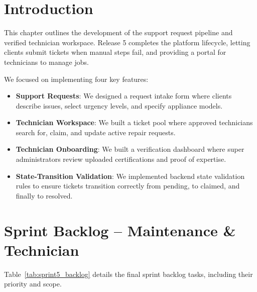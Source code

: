 \documentclass[12pt,a4paper]{report}
\begin{document}
\section{Introduction}

This chapter outlines the development of the support request pipeline and verified technician workspace. Release 5 completes the platform lifecycle, letting clients submit tickets when manual steps fail, and providing a portal for technicians to manage jobs.

We focused on implementing four key features:
\begin{itemize}
    \item \textbf{Support Requests}: We designed a request intake form where clients describe issues, select urgency levels, and specify appliance models.
    \item \textbf{Technician Workspace}: We built a ticket pool where approved technicians search for, claim, and update active repair requests.
    \item \textbf{Technician Onboarding}: We built a verification dashboard where super administrators review uploaded certifications and proof of expertise.
    \item \textbf{State-Transition Validation}: We implemented backend state validation rules to ensure tickets transition correctly from pending, to claimed, and finally to resolved.
\end{itemize}

\section{Sprint Backlog -- Maintenance \& Technician}

Table~\ref{tab:sprint5_backlog} details the final sprint backlog tasks, including their priority and scope.

\renewcommand{\arraystretch}{1.3}
\setlength{\tabcolsep}{8pt}

\begin{table}[!htbp]
\centering
\caption{User stories for Release 5 (Maintenance \& Technician)}
\label{tab:sprint5_backlog}
\end{table}
\end{document}
